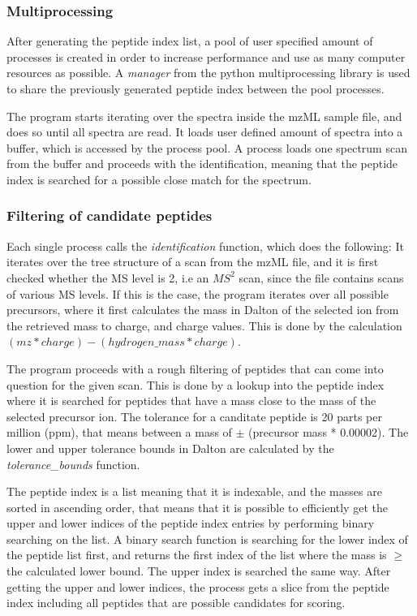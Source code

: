 \documentclass[11pt]{article}
\begin{document}
\subsubsection{Multiprocessing}
After generating the peptide index list, a pool of user specified amount of processes is created in order to increase performance and use as many computer resources as possible. A \textit{manager} from the python multiprocessing library is used to share the previously generated peptide index between the pool processes. 

The program starts iterating over the spectra inside the mzML sample file, and does so until all spectra are read. It loads user defined amount of spectra into a buffer, which is accessed by the process pool. A process loads one spectrum scan from the buffer and proceeds with the identification, meaning that the peptide index is searched for a possible close match for the spectrum.

\subsubsection{Filtering of candidate peptides}
Each single process calls the \textit{identification} function, which does the following:
It iterates over the tree structure of a scan from the mzML file, and it is first checked whether the MS level is 2, i.e an \(MS^2\) scan, since the file contains scans of various MS levels. If this is the case, the program iterates over all possible precursors, where it first calculates the mass in Dalton of the selected ion from the retrieved mass to charge, and charge values. This is done by the calculation \begin{math}(mz * charge) - (hydrogen\_mass * charge)\end{math}.

The program proceeds with a rough filtering of peptides that can come into question for the given scan. This is done by a lookup into the peptide index where it is searched for peptides that have a mass close to the mass of the selected precursor ion. The tolerance for a canditate peptide is 20 parts per million (ppm), that means between a mass of $\pm$ (precursor mass * 0.00002). The lower and upper tolerance bounds in Dalton are calculated by the \textit{tolerance\_bounds} function. 

The peptide index is a list meaning that it is indexable, and the masses are sorted in ascending order, that means that it is possible to efficiently get the upper and lower indices of the peptide index entries by performing binary searching on the list. A binary search function is searching for the lower index of the peptide list first, and returns the first index of the list where the mass is $\ge$ the calculated lower bound. The upper index is searched the same way. After getting the upper and lower indices, the process gets a slice from the peptide index including all peptides that are possible candidates for scoring. 
\end{document}
